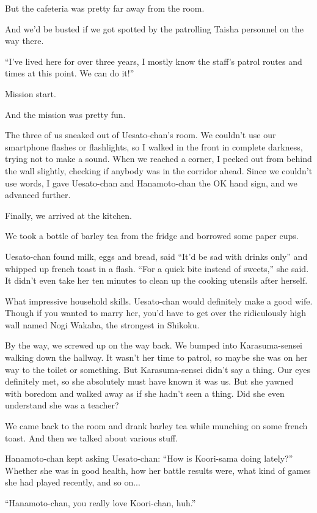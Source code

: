 But the cafeteria was pretty far away from the room.

And we'd be busted if we got spotted by the patrolling Taisha personnel on the way there.

``I've lived here for over three years, I mostly know the staff's patrol routes and times at this point. We can do it!''

Mission start.

And the mission was pretty fun.

The three of us sneaked out of Uesato-chan's room. We couldn't use our smartphone flashes or flashlights, so I walked in the front in complete darkness, trying not to make a sound. When we reached a corner, I peeked out from behind the wall slightly, checking if anybody was in the corridor ahead. Since we couldn't use words, I gave Uesato-chan and Hanamoto-chan the OK hand sign, and we advanced further.

Finally, we arrived at the kitchen.

We took a bottle of barley tea from the fridge and borrowed some paper cups.

Uesato-chan found milk, eggs and bread, said ``It'd be sad with drinks only'' and whipped up french toast in a flash. ``For a quick bite instead of sweets,'' she said. It didn't even take her ten minutes to clean up the cooking utensils after herself.

What impressive household skills. Uesato-chan would definitely make a good wife. Though if you wanted to marry her, you'd have to get over the ridiculously high wall named Nogi Wakaba, the strongest in Shikoku.

By the way, we screwed up on the way back. We bumped into Karasuma-sensei walking down the hallway. It wasn't her time to patrol, so maybe she was on her way to the toilet or something. But Karasuma-sensei didn't say a thing. Our eyes definitely met, so she absolutely must have known it was us. But she yawned with boredom and walked away as if she hadn't seen a thing. Did she even understand she was a teacher?

We came back to the room and drank barley tea while munching on some french toast. And then we talked about various stuff.

Hanamoto-chan kept asking Uesato-chan: ``How is Koori-sama doing lately?'' Whether she was in good health, how her battle results were, what kind of games she had played recently, and so on...

``Hanamoto-chan, you really love Koori-chan, huh.''

